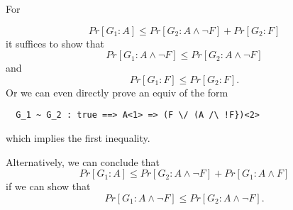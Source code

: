 \documentclass[]{article}
\begin{document}
For

\[
  Pr[G_1 : A] \leq Pr[G_2 : A \land \neg F] + Pr[G_2 : F]
\]
%
it suffices to show that
\[
  Pr[G_1 : A \land \neg F] \leq Pr[G_2 : A \land \neg F]
\]
and
 \[
   Pr[G_1 : F] \leq Pr[G_2 : F].
 \]
%
Or we can even directly prove an equiv of the form
\begin{verbatim}
  G_1 ~ G_2 : true ==> A<1> => (F \/ (A /\ !F})<2>
\end{verbatim}
which implies the first inequality.

Alternatively, we can conclude that
\[
  Pr[G_1 : A] \leq Pr[G_2 : A \land \neg F] + Pr[G_1 : A \land F]
\]
%
if we can show that
\[
  Pr[G_1 : A \land \neg F] \leq Pr[G_2 : A \land \neg F].
\]
\end{document}
